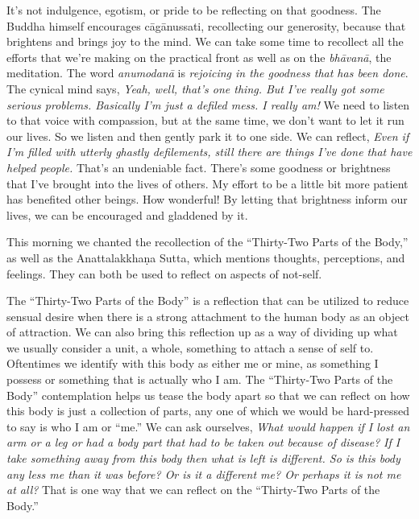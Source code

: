 It's not indulgence, egotism, or pride to be reflecting on that 
goodness. The Buddha himself encourages cāgānussati, recollecting our 
generosity, because that brightens and brings joy to the mind. We can 
take some time to recollect all the efforts that we're making on the 
practical front as well as on the \emph{bhāvanā}, the meditation. The 
word \emph{anumodanā} is \emph{rejoicing in the goodness that has been 
done}. The cynical mind says, \emph{Yeah, well, that's one thing. But 
I've really got some serious problems. Basically I'm just a defiled 
mess. I really am!} We need to listen to that voice with compassion, 
but at the same time, we don't want to let it run our lives. So we 
listen and then gently park it to one side. We can reflect, \emph{Even 
if I'm filled with utterly ghastly defilements, still there are things 
I've done that have helped people.} That's an undeniable fact. There's 
some goodness or brightness that I've brought into the lives of others. 
My effort to be a little bit more patient has benefited other beings. 
How wonderful! By letting that brightness inform our lives, we can be 
encouraged and gladdened by it.


This morning we chanted the recollection of the ``Thirty-Two Parts of 
the Body,'' as well as the Anattalakkhaṇa Sutta, which mentions 
thoughts, perceptions, and feelings. They can both be used to reflect 
on aspects of not-self.

The ``Thirty-Two Parts of the Body'' is a reflection that can be 
utilized to reduce sensual desire when there is a strong attachment to 
the human body as an object of attraction. We can also bring this 
reflection up as a way of dividing up what we usually consider a unit, 
a whole, something to attach a sense of self to. Oftentimes we identify 
with this body as either me or mine, as something I possess or 
something that is actually who I am. The ``Thirty-Two Parts of the 
Body'' contemplation helps us tease the body apart so that we can 
reflect on how this body is just a collection of parts, any one of 
which we would be hard-pressed to say is who I am or ``me.'' We can ask 
ourselves, \emph{What would happen if I lost an arm or a leg or had a 
body part that had to be taken out because of disease?} \emph{If I take 
something away from this body then what is left is different. So is 
this body any less me than it was before? Or is it a different me? Or 
perhaps it is not me at all?} That is one way that we can reflect on 
the ``Thirty-Two Parts of the Body.''

